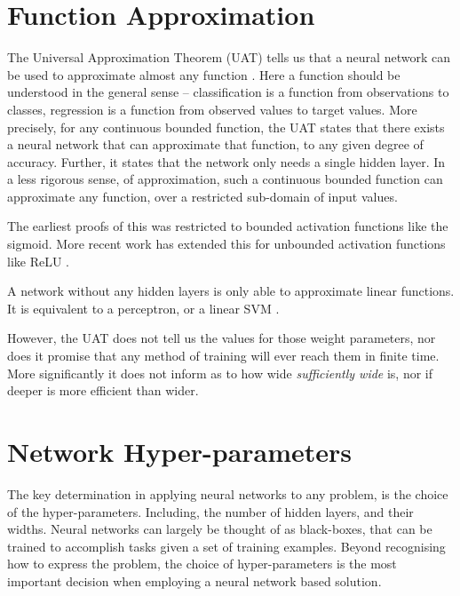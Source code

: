 \documentclass[12pt,parskip]{komatufte}
\begin{document}
\section{Function Approximation}
The Universal Approximation Theorem (UAT) tells us that a neural network can be used to approximate almost any function \parencite{mhaskar1992uat,leshno1993uat,SONODA2017uat}.
Here a function should be understood in the general sense -- classification is a function from observations to classes, regression is a function from observed values to target values.
More precisely, for any continuous bounded function,
the UAT states that there exists a neural network that can approximate that function, to any given degree of accuracy.
Further, it states that the network only needs a single hidden layer.
In a less rigorous sense, of approximation, such a continuous bounded function can approximate any function, over a restricted sub-domain of input values.

The earliest proofs of this was restricted to bounded activation functions like the sigmoid.
More recent work has extended this for unbounded activation functions like ReLU .

A network without any hidden layers is only able to approximate linear functions.
It is equivalent to a perceptron, or a linear SVM \parencite{backprop,minsky2017perceptrons}. 


However, the UAT does not tell us the values for those weight parameters,
nor does it promise that any method of training will ever reach them in finite time.
More significantly it does not inform as to how wide \emph{sufficiently wide} is,
nor if deeper is more efficient than wider.


\section{Network Hyper-parameters}

The key determination in applying neural networks to any problem,
is the choice of the hyper-parameters.
Including, the number of hidden layers, and their widths.
Neural networks can largely be thought of as black-boxes,
that can be trained to  accomplish tasks given a set of training examples.
Beyond recognising how to express the problem,
the choice of hyper-parameters is the most important decision when employing a neural network based solution.
\end{document}
